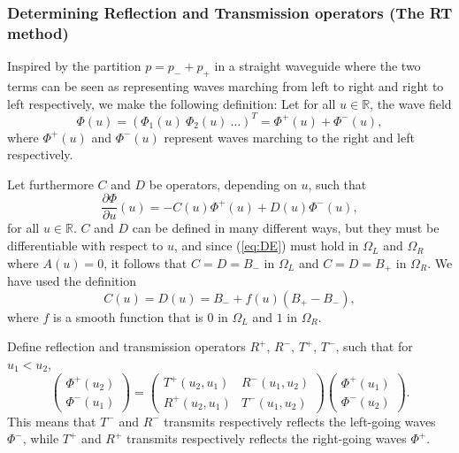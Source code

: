 \documentclass[a4paper,11pt]{article}
\renewcommand{\Phi}{\varPhi}
\renewcommand{\vec}[1]{\bm{#1}}
\newcommand{\R}{\mathbb R}
\renewcommand{\Phi}{\varPhi}
\begin{document}
\subsubsection{Determining Reflection and Transmission operators (The
  RT method)}
\label{sec:RT}



Inspired by the partition $p=p_-+p_+$ in a straight waveguide
where the two terms can be seen as representing waves marching from
left to right and right to left respectively, we make the following
definition: Let for all $u\in\R$, the wave field 
\begin{equation}
  \label{eq:Phipart1}
  \vec\Phi(u)=(\Phi_1(u)\ \Phi_2(u)\ \dots)^T
  =\vec\Phi^+(u)+\vec\Phi^-(u), 
\end{equation}
where $\vec\Phi^+(u)$ and $\vec\Phi^-(u)$ represent waves marching to
the right and left respectively.

Let furthermore $C$ and $D$ be operators, depending on $u$, such that
\begin{equation}
  \label{eq:plusminustodiff}
    \dfrac{\partial\vec\Phi}{\partial u}(u)=
    -C(u)\vec\Phi^+(u)+D(u)\vec\Phi^-(u),
\end{equation}
for all $u\in\R$. $C$ and $D$ can be defined in many different ways,
but they must be differentiable with respect to $u$, and since
(\ref{eq:DE}) must hold in $\Omega_L$ and $\Omega_R$ where $A(u)=0$,
it follows that $C=D=B_-$ in $\Omega_L$ and $C=D=B_+$ in
$\Omega_R$. We have used the definition
\begin{equation}
  \label{eq:CD}
  C(u)=D(u)=B_-+f(u)(B_+-B_-),
\end{equation}
where $f$ is a smooth function that is $0$ in $\Omega_L$ and $1$ in
$\Omega_R$. 

Define reflection and transmission
operators $R^+$, $R^-$, $T^+$, $T^-$, such that for $u_1<u_2$,
\begin{equation}
  \label{eq:RT}
  \begin{pmatrix}
    \vec\Phi^+(u_2)\\
    \vec\Phi^-(u_1)
  \end{pmatrix}=
  \begin{pmatrix}
    T^+(u_2,u_1)&R^-(u_1,u_2)\\
    R^+(u_2,u_1)&T^-(u_1,u_2)
  \end{pmatrix}
  \begin{pmatrix}
    \vec\Phi^+(u_1)\\
    \vec\Phi^-(u_2)
  \end{pmatrix}.
\end{equation}
This means that $T^-$ and $R^-$ transmits respectively reflects the
left-going waves $\vec\Phi^-$, while $T^+$ and $R^+$ transmits
respectively reflects the right-going waves $\vec\Phi^+$.
\end{document}
